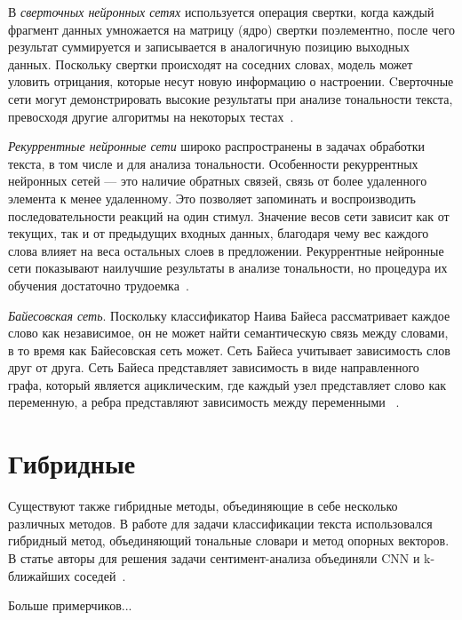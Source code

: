В \textit{сверточных нейронных сетях} используется операция свертки, когда
каждый фрагмент данных умножается на матрицу (ядро) свертки поэлементно, после
чего результат суммируется и записывается в аналогичную позицию выходных данных.
Поскольку свертки происходят на соседних словах, модель может уловить отрицания,
которые несут новую информацию о настроении. Cверточные сети могут
демонстрировать высокие результаты при анализе тональности текста, превосходя
другие алгоритмы на некоторых тестах~\cite{article9}.

\textit{Рекуррентные нейронные сети} широко распространены в задачах обработки
текста, в том числе и для анализа тональности. Особенности рекуррентных
нейронных сетей --- это наличие обратных связей, связь от более удаленного
элемента к менее удаленному. Это позволяет запоминать и воспроизводить
последовательности реакций на один стимул. Значение весов сети зависит как от
текущих, так и от предыдущих входных данных, благодаря чему вес каждого слова
влияет на веса остальных слоев в предложении.  Рекуррентные нейронные сети
показывают наилучшие результаты в анализе тональности, но процедура их обучения
достаточно трудоемка~\cite{article9}.

\textit{Байесовская сеть}. Поскольку классификатор Наива Байеса рассматривает
каждое слово как независимое, он не может найти семантическую связь между
словами, в то время как Байесовская сеть может. Сеть Байеса учитывает
зависимость слов друг от друга. Сеть Байеса представляет зависимость в виде
направленного графа, который является ациклическим, где каждый узел представляет
слово как переменную, а ребра представляют зависимость между переменными
~\cite{article16}.

\section{Гибридные}

Существуют также гибридные методы, объединяющие в себе несколько различных
методов.  В работе для задачи классификации текста использовался гибридный
метод, объединяющий тональные словари и метод опорных векторов.  В статье
авторы для решения задачи сентимент-анализа объединяли CNN и k-ближайших
соседей~\cite{article14}.

Больше примерчиков...


